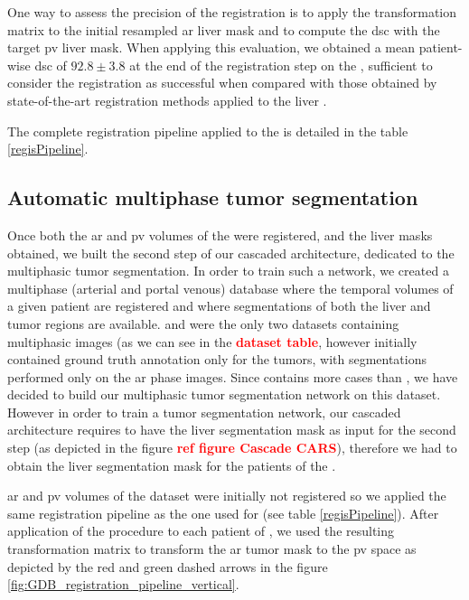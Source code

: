 One way to assess the precision of the registration is to apply the
transformation matrix to the initial resampled \ac{ar} liver mask and to
compute the \ac{dsc} with the target \ac{pv} liver mask. When applying this
evaluation, we obtained a mean patient-wise \ac{dsc} of $ 92.8 \pm 3.8 $ at the
end of the registration step on the , sufficient to consider the
registration as successful when compared with those obtained by state-of-the-art
registration methods applied to the liver \cite{Zhao2019}.

The complete registration pipeline applied to the  is detailed in the table \ref{regisPipeline}.

\subsection{Automatic multiphase tumor
segmentation}\label{tcia-db-unsupervised-multiphase-tumor-segmentation}

Once both the \ac{ar} and \ac{pv} volumes of the  were registered, and the
liver masks obtained, we built the second step of our cascaded
architecture, dedicated to the multiphasic tumor segmentation. In order
to train such a network, we created a multiphase (arterial and portal
venous) database where the temporal volumes of a given patient are
registered and where segmentations of both the liver and tumor regions
are available.
 and  were the only two datasets containing multiphasic
images (as we can see in the \textcolor{red}{\textbf{dataset table}}, however
 initially contained ground truth annotation only for the tumors,
with segmentations performed only on the \ac{ar} phase images.
Since  contains more cases than , we have decided to
build our multiphasic tumor segmentation network on this dataset.
However in order to train a tumor segmentation network, our cascaded
architecture requires to have the liver segmentation mask as input for
the second step (as depicted in the figure \textcolor{red}{\textbf{ref figure
Cascade CARS}}), therefore we had to obtain the liver segmentation
mask for the patients of the .

\ac{ar} and \ac{pv} volumes of the  dataset were initially not registered so
we applied the same registration pipeline as the one used for  (see table \ref{regisPipeline}). After application of the procedure to
each patient of , we used the resulting transformation matrix to
transform the \ac{ar} tumor mask to the \ac{pv} space as depicted by the red and green dashed arrows in the figure \ref{fig:GDB_registration_pipeline_vertical}.


